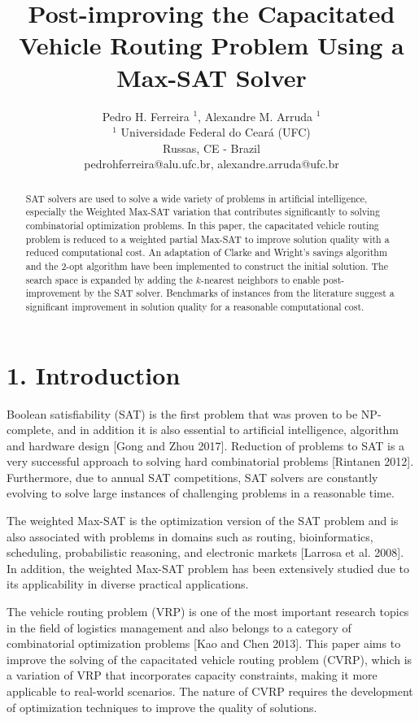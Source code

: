 \documentclass[10pt]{article}
\title{Post-improving the Capacitated Vehicle Routing Problem Using a Max-SAT Solver }
\author{Pedro H. Ferreira ${ }^{1}$, Alexandre M. Arruda ${ }^{1}$\\
${ }^{1}$ Universidade Federal do Ceará (UFC)\\
Russas, CE - Brazil\\
pedrohferreira@alu.ufc.br, alexandre.arruda@ufc.br}
\date{}
\begin{document}
\maketitle
\captionsetup{singlelinecheck=false}


\begin{abstract}
SAT solvers are used to solve a wide variety of problems in artificial intelligence, especially the Weighted Max-SAT variation that contributes significantly to solving combinatorial optimization problems. In this paper, the capacitated vehicle routing problem is reduced to a weighted partial Max-SAT to improve solution quality with a reduced computational cost. An adaptation of Clarke and Wright's savings algorithm and the 2-opt algorithm have been implemented to construct the initial solution. The search space is expanded by adding the $k$-nearest neighbors to enable post-improvement by the SAT solver. Benchmarks of instances from the literature suggest a significant improvement in solution quality for a reasonable computational cost.
\end{abstract}

\section*{1. Introduction}
Boolean satisfiability (SAT) is the first problem that was proven to be NP-complete, and in addition it is also essential to artificial intelligence, algorithm and hardware design [Gong and Zhou 2017]. Reduction of problems to SAT is a very successful approach to solving hard combinatorial problems [Rintanen 2012]. Furthermore, due to annual SAT competitions, SAT solvers are constantly evolving to solve large instances of challenging problems in a reasonable time.

The weighted Max-SAT is the optimization version of the SAT problem and is also associated with problems in domains such as routing, bioinformatics, scheduling, probabilistic reasoning, and electronic markets [Larrosa et al. 2008]. In addition, the weighted Max-SAT problem has been extensively studied due to its applicability in diverse practical applications.

The vehicle routing problem (VRP) is one of the most important research topics in the field of logistics management and also belongs to a category of combinatorial optimization problems [Kao and Chen 2013]. This paper aims to improve the solving of the capacitated vehicle routing problem (CVRP), which is a variation of VRP that incorporates capacity constraints, making it more applicable to real-world scenarios. The nature of CVRP requires the development of optimization techniques to improve the quality of solutions.
\end{document}
